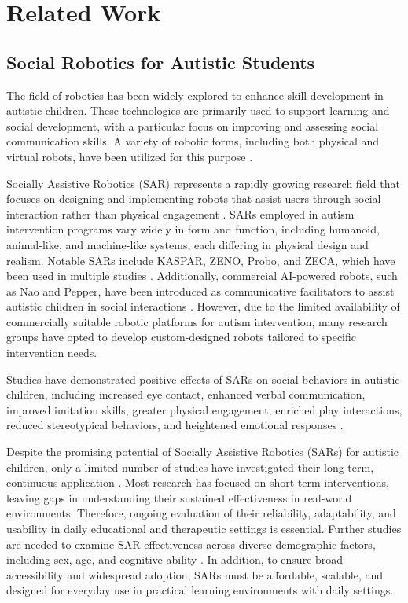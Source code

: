 \section{Related Work}
\subsection{Social Robotics for Autistic Students} %

The field of robotics has been widely explored to enhance skill development in autistic children. These technologies are primarily used to support learning and social development, with a particular focus on improving and assessing social communication skills. A variety of robotic forms, including both physical and virtual robots, have been utilized for this purpose \cite{Mohammed2020robot}.

Socially Assistive Robotics (SAR) represents a rapidly growing research field that focuses on designing and implementing robots that assist users through social interaction rather than physical engagement \cite{Diehl2012cu}\cite{Ricks2010tc}\cite{Syriopoulou-Delli2020ra}. SARs employed in autism intervention programs vary widely in form and function, including humanoid, animal-like, and machine-like systems, each differing in physical design and realism. Notable SARs include KASPAR, ZENO, Probo, and ZECA, which have been used in multiple studies \cite{Syriopoulou-Delli2020ra}. Additionally, commercial AI-powered robots, such as Nao and Pepper, have been introduced as communicative facilitators to assist autistic children in social interactions \cite{10.1145/3461615.3485421}\cite{Lemaignan2024pepper}. However, due to the limited availability of commercially suitable robotic platforms for autism intervention, many research groups have opted to develop custom-designed robots tailored to specific intervention needs. 

Studies have demonstrated positive effects of SARs on social behaviors in autistic children, including increased eye contact, enhanced verbal communication, improved imitation skills, greater physical engagement, enriched play interactions, reduced stereotypical behaviors, and heightened emotional responses \cite{Scassellati2012ar}.

Despite the promising potential of Socially Assistive Robotics (SARs) for autistic children, only a limited number of studies have investigated their long-term, continuous application \cite{conti2017dd}\cite{vagnetti2024social}. Most research has focused on short-term interventions, leaving gaps in understanding their sustained effectiveness in real-world environments. Therefore, ongoing evaluation of their reliability, adaptability, and usability in daily educational and therapeutic settings is essential. Further studies are needed to examine SAR effectiveness across diverse demographic factors, including sex, age, and cognitive ability \cite{Mohammed2020robot}. In addition, to ensure broad accessibility and widespread adoption, SARs must be affordable, scalable, and designed for everyday use in practical learning environments with daily settings. 

